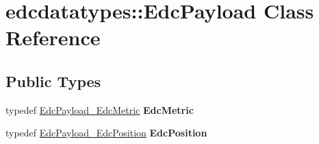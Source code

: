 \hypertarget{classedcdatatypes_1_1_edc_payload}{\section{edcdatatypes\-:\-:Edc\-Payload Class Reference}
\label{classedcdatatypes_1_1_edc_payload}
}
\subsection*{Public Types}
\begin{DoxyCompactItemize}
\item 
\hypertarget{classedcdatatypes_1_1_edc_payload_a7127e1eeb94725ecc3ff35d5cff1c5f0}{typedef \hyperlink{classedcdatatypes_1_1_edc_payload___edc_metric}{Edc\-Payload\-\_\-\-Edc\-Metric} {\bfseries Edc\-Metric}}\label{classedcdatatypes_1_1_edc_payload_a7127e1eeb94725ecc3ff35d5cff1c5f0}

\item 
\hypertarget{classedcdatatypes_1_1_edc_payload_a8ecaa1b914da723b42a609fa9c2592f1}{typedef \hyperlink{classedcdatatypes_1_1_edc_payload___edc_position}{Edc\-Payload\-\_\-\-Edc\-Position} {\bfseries Edc\-Position}}\label{classedcdatatypes_1_1_edc_payload_a8ecaa1b914da723b42a609fa9c2592f1}

\end{DoxyCompactItemize}
